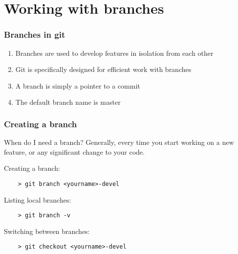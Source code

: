 \section{Working with branches}

\begin{frame}
	\frametitle{Branches in git}
	
	\begin{enumerate}
		\item Branches are used to develop features in isolation from each other
		\item Git is specifically designed for efficient work with branches
		\item A branch is simply a pointer to a commit
		\item The default branch name is \alert{master}
	\end{enumerate}	
	
	
\end{frame}


\begin{frame}[fragile]
	\frametitle{Creating a branch}
	
	\begin{block}{When do I need a branch?}
	Generally, every time you start working on a new feature, or any significant change to your code.
	\end{block}
	
	Creating a branch:
	\begin{verbatim}
	> git branch <yourname>-devel
	\end{verbatim}
	
	Listing local branches:
	\begin{verbatim}
	> git branch -v
	\end{verbatim}	
	
	Switching between branches:
	\begin{verbatim}
	> git checkout <yourname>-devel
	\end{verbatim}
	
	
\end{frame}


